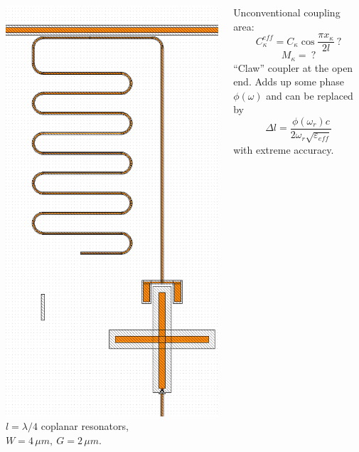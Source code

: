 \documentclass[aspectratio=169, 13pt]{beamer}
\begin{document}
\begin{frame}[c]\frametitle{\secname}\framesubtitle{\subsecname}
\begin{columns}[c]
\includegraphics[height=0.9\textheight]{xmonres}
$l = \lambda/4$ coplanar resonators, $W=4\,\mu m,\ G=2\,\mu m$.

\vspace{0.5cm}
Unconventional coupling area:
 $$C_\kappa^{eff} = C_\kappa \cos \frac{\pi x_\kappa}{2 l}\ ?$$
 $$M_\kappa =\ ?$$
``Claw'' coupler at the open end. Adds up some phase $\phi(\omega)$ and can be replaced by
$$\Delta l = \frac{\phi(\omega_r) c}{2 \omega_r \sqrt{\varepsilon_{eff}}}$$
with extreme accuracy.
\end{columns}
\end{frame}
\end{document}
